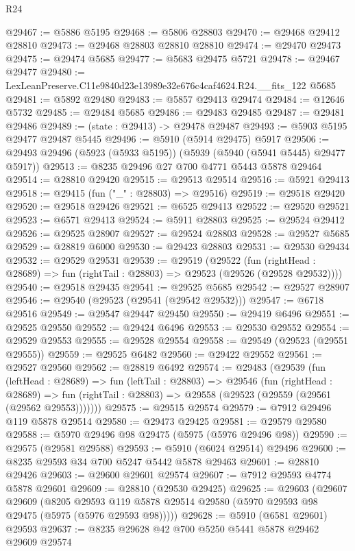 \begin{lexlean}{R24}
\begin{coremodule}
@29467 := @5886 @5195
@29468 := @5806 @28803
@29470 := @29468 @29412 @28810
@29473 := @29468 @28803 @28810 @28810
@29474 := @29470 @29473
@29475 := @29474 @5685
@29477 := @5683 @29475 @5721
@29478 := @29467 @29477
@29480 := LexLeanPreserve.C11e9840d23e13989e32e676c4caf4624.R24.__fits_122 @5685
@29481 := @5892 @29480
@29483 := @5857 @29413 @29474
@29484 := @12646 @5732
@29485 := @29484 @5685
@29486 := @29483 @29485
@29487 := @29481 @29486
@29489 := (state : @29413) -> @29478 @29487
@29493 := @5903 @5195 @29477 @29487 @5445
@29496 := @5910 (@5914 @29475) @5917
@29506 := @29493 @29496 (@5923 (@5933 @5195)) (@5939 (@5940 (@5941 @5445) @29477 @5917))
@29513 := @8235 @29496 @27 @700 @4771 @5443 @5878 @29464
@29514 := @28810 @29420
@29515 := @29513 @29514
@29516 := @5921 @29413
@29518 := @29415 (fun ("_" : @28803) => @29516)
@29519 := @29518 @29420
@29520 := @29518 @29426
@29521 := @6525 @29413
@29522 := @29520 @29521
@29523 := @6571 @29413
@29524 := @5911 @28803
@29525 := @29524 @29412
@29526 := @29525 @28907
@29527 := @29524 @28803
@29528 := @29527 @5685
@29529 := @28819 @6000
@29530 := @29423 @28803
@29531 := @29530 @29434
@29532 := @29529 @29531
@29539 := @29519
    (@29522
      (fun (rightHead : @28689) => fun (rightTail : @28803) => @29523 (@29526 (@29528 @29532))))
@29540 := @29518 @29435
@29541 := @29525 @5685
@29542 := @29527 @28907
@29546 := @29540 (@29523 (@29541 (@29542 @29532)))
@29547 := @6718 @29516
@29549 := @29547 @29447 @29450
@29550 := @29419 @6496
@29551 := @29525 @29550
@29552 := @29424 @6496
@29553 := @29530 @29552
@29554 := @29529 @29553
@29555 := @29528 @29554
@29558 := @29549 (@29523 (@29551 @29555))
@29559 := @29525 @6482
@29560 := @29422 @29552
@29561 := @29527 @29560
@29562 := @28819 @6492
@29574 := @29483
    (@29539
      (fun (leftHead : @28689) =>
      fun (leftTail : @28803) =>
      @29546
        (fun (rightHead : @28689) =>
        fun (rightTail : @28803) => @29558 (@29523 (@29559 (@29561 (@29562 @29553)))))))
@29575 := @29515 @29574
@29579 := @7912 @29496 @119 @5878 @29514
@29580 := @29473 @29425
@29581 := @29579 @29580
@29588 := @5970 @29496 @98 @29475 (@5975 (@5976 @29496 @98))
@29590 := @29575 (@29581 @29588)
@29593 := @5910 (@6024 @29514) @29496
@29600 := @8235 @29593 @34 @700 @5247 @5442 @5878 @29463
@29601 := @28810 @29426
@29603 := @29600 @29601 @29574
@29607 := @7912 @29593 @4774 @5878 @29601
@29609 := @28810 (@29530 @29425)
@29625 := @29603
    (@29607
      @29609
      (@8205 @29593 @119 @5878 @29514 @29580 (@5970 @29593 @98 @29475 (@5975 (@5976 @29593 @98)))))
@29628 := @5910 (@6581 @29601) @29593
@29637 := @8235 @29628 @42 @700 @5250 @5441 @5878 @29462 @29609 @29574

\end{coremodule}
\end{lexlean}

